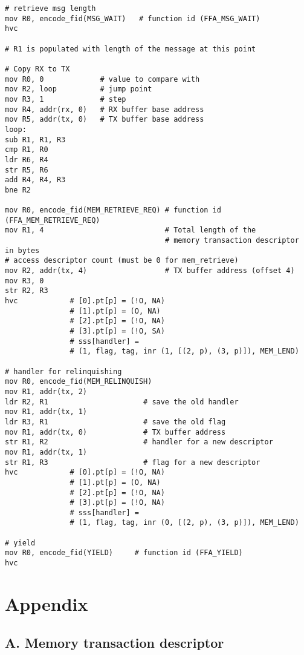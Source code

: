 \documentclass{article}
\begin{document}
\begin{lstlisting}[caption={VM 3}]
# retrieve msg length
mov R0, encode_fid(MSG_WAIT)   # function id (FFA_MSG_WAIT)
hvc

# R1 is populated with length of the message at this point

# Copy RX to TX
mov R0, 0             # value to compare with
mov R2, loop          # jump point
mov R3, 1             # step
mov R4, addr(rx, 0)   # RX buffer base address
mov R5, addr(tx, 0)   # TX buffer base address
loop:
sub R1, R1, R3
cmp R1, R0
ldr R6, R4
str R5, R6
add R4, R4, R3
bne R2

mov R0, encode_fid(MEM_RETRIEVE_REQ) # function id (FFA_MEM_RETRIEVE_REQ)
mov R1, 4                            # Total length of the  
                                     # memory transaction descriptor in bytes
# access descriptor count (must be 0 for mem_retrieve)
mov R2, addr(tx, 4)                  # TX buffer address (offset 4)
mov R3, 0
str R2, R3                                    
hvc            # [0].pt[p] = (!O, NA)
               # [1].pt[p] = (O, NA)
               # [2].pt[p] = (!O, NA)
               # [3].pt[p] = (!O, SA)
               # sss[handler] = 
               # (1, flag, tag, inr (1, [(2, p), (3, p)]), MEM_LEND)

# handler for relinquishing
mov R0, encode_fid(MEM_RELINQUISH)
mov R1, addr(tx, 2)
ldr R2, R1                      # save the old handler
mov R1, addr(tx, 1)
ldr R3, R1                      # save the old flag
mov R1, addr(tx, 0)             # TX buffer address
str R1, R2                      # handler for a new descriptor
mov R1, addr(tx, 1)
str R1, R3                      # flag for a new descriptor
hvc            # [0].pt[p] = (!O, NA)
               # [1].pt[p] = (O, NA)
               # [2].pt[p] = (!O, NA)
               # [3].pt[p] = (!O, NA)
               # sss[handler] = 
               # (1, flag, tag, inr (0, [(2, p), (3, p)]), MEM_LEND)

# yield
mov R0, encode_fid(YIELD)     # function id (FFA_YIELD)
hvc
\end{lstlisting}

\section*{Appendix}

\subsection*{A. Memory transaction descriptor}
\end{document}
